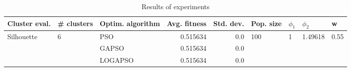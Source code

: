 \begin{table}
\centering
\caption{Results of experiments}
\begin{tabular}{lllrrllll}
\toprule
              Cluster eval. &        \# clusters & Optim. algorithm &  Avg. fitness &  Std. dev. &            Pop. size &         $\phi_{1}$ &               $\phi_{2}$ &                     w \\
\midrule
\multirow{3}{*}{Silhouette} & \multirow{3}{*}{6} &              PSO &      0.515634 &        0.0 & \multirow{3}{*}{100} & \multirow{3}{*}{1} & \multirow{3}{*}{1.49618} & \multirow{3}{*}{0.55} \\
                            &                    &            GAPSO &      0.515634 &        0.0 &                      &                    &                          &                       \\
                            &                    &          LOGAPSO &      0.515634 &        0.0 &                      &                    &                          &                       \\
\bottomrule
\end{tabular}
\end{table}
